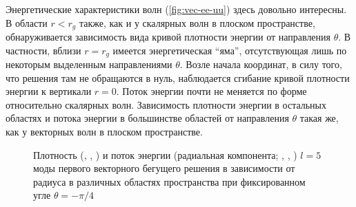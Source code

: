 \documentclass[\docroot/reports/draft/report.tex]{subfiles}
\begin{document}
        Энергетические характеристики волн (\autoref{fig:vec-ee-uu}) здесь довольно интересны. В области $r < r_g$ также, как и у скалярных волн в плоском пространстве, обнаруживается зависимость вида кривой плотности энергии от направления $\theta$. В частности, вблизи $r = r_g$ имеется энергетическая \enquote{яма}, отсутствующая лишь по некоторым выделенным направлениями $\theta$. Возле начала координат, в силу того, что решения там не обращаются в нуль, наблюдается сгибание кривой плотности энергии к вертикали $r = 0$. Поток энергии почти не меняется по форме относительно скалярных волн. Зависимость плотности энергии в остальных областях и потока энергии в большинстве областей от направления $\theta$ такая же, как у векторных волн в плоском пространстве.
        \begin{figure}[h]
            \centering
            \hspace{8pt}%
            \hspace{8pt}%
            \hspace{8pt}%
            \hspace{8pt}%
            \hspace{8pt}%
            \hspace{8pt}%
            \caption[]{Плотность (, , ) и поток энергии (радиальная компонента; , , ) $l=5$ моды первого векторного бегущего решения в зависимости от радиуса в различных областях пространства при фиксированном угле $\theta = -\pi/4$}%
            \label{fig:vec-ee-uu}%
        \end{figure}
\end{document}
